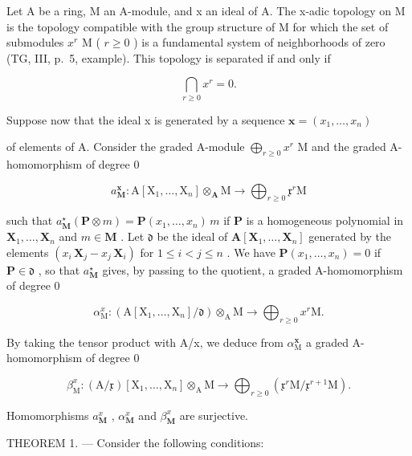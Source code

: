 Let A be a ring, M an A-module, and x an ideal of A. The x-adic topology on M is the topology compatible with the group structure of M for which the set of submodules \(x^{r}\) M ( \(r \geqslant 0\) ) is a fundamental system of neighborhoods of zero (TG, III, p.~5, example). This topology is separated if and only if

\[
\bigcap_ {r \geqslant 0} x ^ {r} = 0.
\]

Suppose now that the ideal x is generated by a sequence \(\boldsymbol{x}=(x_{1},\ldots,x_{n})\)

of elements of A. Consider the graded A-module \(\bigoplus_{r\geqslant 0}x^{r}\) M and the graded A-homomorphism of degree 0

\[
a _ {\mathbf {M}} ^ {\mathbf {x}}: \mathrm{A} [ \mathrm{X} _ {1}, \dots , \mathrm{X} _ {n} ] \otimes_ {\mathbf {A}} \mathrm{M} \rightarrow \bigoplus_ {r \geqslant 0} \mathfrak {x} ^ {r} \mathrm{M}
\]

such that \(a_{\mathbf{M}}^{\star}(\mathbf{P} \otimes m) = \mathbf{P}(x_1, \ldots, x_n) \, m\) if \(\mathbf{P}\) is a homogeneous polynomial in \(\mathbf{X}_1, \ldots, \mathbf{X}_n\) and \(m \in \mathbf{M}\) . Let \(\mathfrak{d}\) be the ideal of \(\mathbf{A}[\mathbf{X}_1, \ldots, \mathbf{X}_n]\) generated by the elements \((x_i \, \mathbf{X}_j - x_j \, \mathbf{X}_i)\) for \(1 \leqslant i < j \leqslant n\) . We have \(\mathbf{P}(x_1, \ldots, x_n) = 0\) if \(\mathbf{P} \in \mathfrak{d}\) , so that \(a_{\mathbf{M}}^{\star}\) gives, by passing to the quotient, a graded A-homomorphism of degree 0

\[
\alpha_ {\mathrm{M}} ^ {x}: \left(\mathrm{A} \left[ \mathrm{X} _ {1}, \dots , \mathrm{X} _ {n} \right] / \mathfrak {d}\right) \otimes_ {\mathrm{A}} \mathrm{M} \rightarrow \bigoplus_ {r \geqslant 0} x ^ {r} \mathrm{M}.
\]

By taking the tensor product with A/x, we deduce from \(\alpha_{\mathrm{M}}^{\mathbf{x}}\) a graded A-homomorphism of degree 0

\[
\beta_ {\mathrm{M}} ^ {x}: (\mathrm{A} / \mathfrak {x}) [ \mathrm{X} _ {1}, \dots , \mathrm{X} _ {n} ] \otimes_ {\mathrm{A}} \mathrm{M} \rightarrow \bigoplus_ {r \geqslant 0} (\mathfrak {x} ^ {r} \mathrm{M} / \mathfrak {x} ^ {r + 1} \mathrm{M}).
\]

Homomorphisms \(a_{\mathbf{M}}^{x}\) , \(\alpha_{\mathbf{M}}^{x}\) and \(\beta_{\mathbf{M}}^{x}\) are surjective.

THEOREM 1. --- Consider the following conditions:

